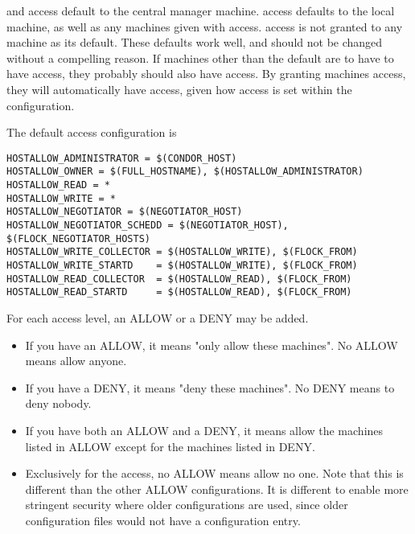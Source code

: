  and  access default to 
the central manager machine.
 access defaults to the local machine, as well as
any machines
given with  access.
 access is not granted to any machine
as its default.
These defaults work well, and should not be changed without
a compelling reason.
If machines other than the default are to have to have 
access, they probably should also have  access.
By granting machines  access, they
will automatically have  access, given how
 access is set within the configuration.

The default access configuration is
\begin{verbatim}
HOSTALLOW_ADMINISTRATOR = $(CONDOR_HOST)
HOSTALLOW_OWNER = $(FULL_HOSTNAME), $(HOSTALLOW_ADMINISTRATOR)
HOSTALLOW_READ = *
HOSTALLOW_WRITE = *
HOSTALLOW_NEGOTIATOR = $(NEGOTIATOR_HOST)
HOSTALLOW_NEGOTIATOR_SCHEDD = $(NEGOTIATOR_HOST), $(FLOCK_NEGOTIATOR_HOSTS)
HOSTALLOW_WRITE_COLLECTOR = $(HOSTALLOW_WRITE), $(FLOCK_FROM)
HOSTALLOW_WRITE_STARTD    = $(HOSTALLOW_WRITE), $(FLOCK_FROM)
HOSTALLOW_READ_COLLECTOR  = $(HOSTALLOW_READ), $(FLOCK_FROM)
HOSTALLOW_READ_STARTD     = $(HOSTALLOW_READ), $(FLOCK_FROM)
\end{verbatim}

For each access level, an ALLOW or a DENY may be added.
\begin{itemize}

\item If you have an ALLOW, it means "only allow these machines".  No
    ALLOW means allow anyone.

\item If you have a DENY, it means "deny these machines".  No DENY
    means to deny nobody.

\item If you have both an ALLOW and a DENY, it means allow the
    machines listed in ALLOW except for the machines listed in DENY.

\item Exclusively for the  access,
    no ALLOW means allow no one.
    Note that this is different than the other ALLOW configurations.
    It is different to enable more stringent security where
    older configurations are used, since
    older configuration files would not have a 
     configuration entry.
\end{itemize}

